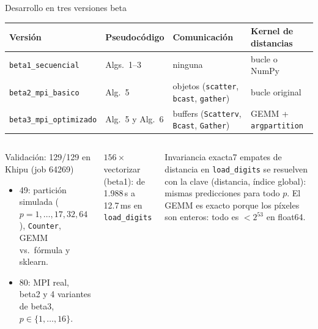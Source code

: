 \documentclass[aspectratio=169,10pt]{beamer}
\renewenvironment{exampleblock}[1]{\begin{caja}[cajaverde]{#1}}{\end{caja}}
\newenvironment{infoblock}[1]{\begin{caja}[cajacian]{#1}}{\end{caja}}
\newcommand{\cifra}[3][cianclaro]{%
  \begin{tcolorbox}[enhanced,colback=navy,colframe=navy,boxrule=0pt,arc=0pt,halign=center,
    left=3pt,right=3pt,top=4pt,bottom=4pt,before skip=2pt,after skip=4pt]
  {\color{#1}\large\bfseries #2}\\[1pt]{\color{white}\scriptsize #3}\end{tcolorbox}}
\begin{document}
\begin{frame}{Desarrollo en tres versiones beta}
\footnotesize
\begin{tabular}{@{}llll@{}}\toprule
Versión & Pseudocódigo & Comunicación & Kernel de distancias\\\midrule
\texttt{beta1\_secuencial} & Algs.\ 1--3 & ninguna & bucle o NumPy\\
\texttt{beta2\_mpi\_basico} & Alg.\ 5 & objetos (\texttt{scatter}, \texttt{bcast}, \texttt{gather}) & bucle original\\
\texttt{beta3\_mpi\_optimizado} & Alg.\ 5 y Alg.\ 6 & buffers (\texttt{Scatterv}, \texttt{Bcast}, \texttt{Gather}) & GEMM + \texttt{argpartition}\\\bottomrule
\end{tabular}
\vspace{8pt}
\begin{columns}[T]
\begin{exampleblock}{Validación: 129/129 en Khipu (job 64269)}
\begin{itemize}\setlength{\itemsep}{1pt}
\item 49: partición simulada ($p=1,\dots,17,32,64$), \texttt{Counter}, GEMM vs.\ fórmula y sklearn.
\item 80: MPI real, beta2 y 4 variantes de beta3, $p\in\{1,\dots,16\}$.
\end{itemize}
\end{exampleblock}
\cifra{$156\times$}{vectorizar (beta1): de 1.988\,s a 12.7\,ms en \texttt{load\_digits}}
\begin{infoblock}{Invariancia exacta}7 empates de distancia en \texttt{load\_digits} se resuelven con la clave (distancia, índice global): mismas predicciones para todo $p$. El GEMM es exacto porque los píxeles son enteros: todo es $<2^{53}$ en float64.\end{infoblock}
\end{columns}
\end{frame}
\end{document}
